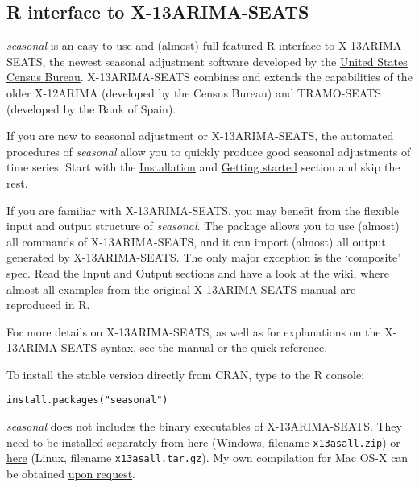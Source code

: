 \subsection{R interface to
X-13ARIMA-SEATS}\label{r-interface-to-x-13arima-seats}

\emph{seasonal} is an easy-to-use and (almost) full-featured R-interface
to X-13ARIMA-SEATS, the newest seasonal adjustment software developed by
the \href{http://www.census.gov/srd/www/x13as/}{United States Census
Bureau}. X-13ARIMA-SEATS combines and extends the capabilities of the
older X-12ARIMA (developed by the Census Bureau) and TRAMO-SEATS
(developed by the Bank of Spain).

If you are new to seasonal adjustment or X-13ARIMA-SEATS, the automated
procedures of \emph{seasonal} allow you to quickly produce good seasonal
adjustments of time series. Start with the
\hyperref[installation]{Installation} and
\hyperref[getting-started]{Getting started} section and skip the rest.

If you are familiar with X-13ARIMA-SEATS, you may benefit from the
flexible input and output structure of \emph{seasonal}. The package
allows you to use (almost) all commands of X-13ARIMA-SEATS, and it can
import (almost) all output generated by X-13ARIMA-SEATS. The only major
exception is the `composite' spec. Read the \hyperref[input]{Input} and
\hyperref[output]{Output} sections and have a look at the
\href{https://github.com/christophsax/seasonal/wiki/Examples-of-X-13ARIMA-SEATS-in-R}{wiki},
where almost all examples from the original X-13ARIMA-SEATS manual are
reproduced in R.

For more details on X-13ARIMA-SEATS, as well as for explanations on the
X-13ARIMA-SEATS syntax, see the
\href{http://www.census.gov/ts/x13as/docX13AS.pdf}{manual} or the
\href{http://www.census.gov/ts/x13as/pc/qrefX13ASpc.pdf}{quick
reference}.


To install the stable version directly from CRAN, type to the R console:

\begin{verbatim}
install.packages("seasonal")
\end{verbatim}

\emph{seasonal} does not includes the binary executables of
X-13ARIMA-SEATS. They need to be installed separately from
\href{http://www.census.gov/srd/www/x13as/x13down_pc.html}{here}
(Windows, filename \texttt{x13asall.zip}) or
\href{http://www.census.gov/srd/www/x13as/x13down_unix.html}{here}
(Linux, filename \texttt{x13asall.tar.gz}). My own compilation for Mac
OS-X can be obtained \href{mailto:christoph.sax@gmail.com}{upon
request}.

